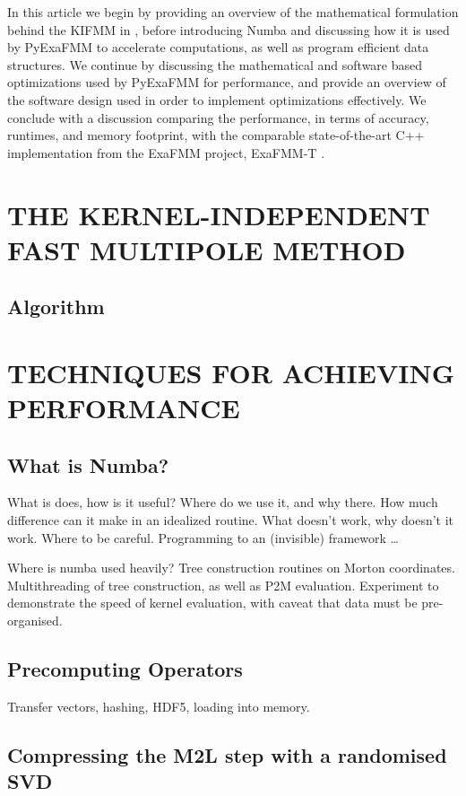 \documentclass{IEEEcsmag}
\begin{document}
In this article we begin by providing an overview of the mathematical formulation behind the KIFMM in \cite{Ying2004}, before introducing Numba and discussing how it is used by PyExaFMM to accelerate computations, as well as program efficient data structures. We continue by discussing the mathematical and software based optimizations used by PyExaFMM for performance, and provide an overview of the software design used in order to implement optimizations effectively. We conclude with a discussion comparing the performance, in terms of accuracy, runtimes, and memory footprint, with the comparable state-of-the-art C++ implementation from the ExaFMM project, ExaFMM-T \cite{Wang2021}.

\section{THE KERNEL-INDEPENDENT FAST MULTIPOLE METHOD}


\subsection{Algorithm}

\section{TECHNIQUES FOR ACHIEVING PERFORMANCE}

\subsection{What is Numba?}

What is does, how is it useful? Where do we use it, and why there. How much difference can it make in an idealized routine. What doesn't work, why doesn't it work. Where to be careful. Programming to an (invisible) framework \dots

Where is numba used heavily? Tree construction routines on Morton coordinates. Multithreading of tree construction, as well as P2M evaluation. Experiment to demonstrate the speed of kernel evaluation, with caveat that data must be pre-organised.

\subsection{Precomputing Operators}

Transfer vectors, hashing, HDF5, loading into memory.

\subsection{Compressing the M2L step with a randomised SVD}
\end{document}
